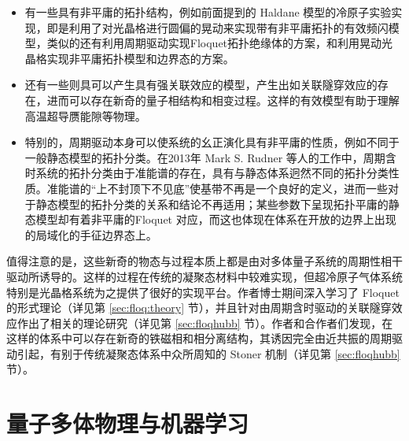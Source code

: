 \begin{itemize}

\item 有一些具有非平庸的拓扑结构，例如前面提到的 Haldane 模型的冷原子实验实现\cite{haldane-expr-2014}，即是利用了对光晶格进行圆偏的晃动来实现带有非平庸拓扑的有效频闪模型\cite{oka2009}，类似的还有利用周期驱动实现Floquet拓扑绝缘体的方案\cite{floq-ti-2011}，和利用晃动光晶格实现非平庸拓扑模型和边界态的方案\cite{zhengwei-floquet-2014}。

\item 还有一些则具可以产生具有强关联效应的模型，产生出如关联隧穿效应的存在\cite{correlated-tunnel-expr-2018-shaking,correlated-tunnel-expr-2018-raman}，进而可以存在新奇的量子相结构和相变过程\cite{floqhubb}。这样的有效模型有助于理解高温超导赝能隙等物理。

\item 特别的，周期驱动本身可以使系统的幺正演化具有非平庸的性质，例如不同于一般静态模型的拓扑分类\cite{floq-edgestate-2013-prx}。在2013年 Mark S. Rudner 等人的工作中，周期含时系统的拓扑分类由于准能谱的存在，具有与静态体系迥然不同的拓扑分类性质。准能谱的“上不封顶下不见底”使基带不再是一个良好的定义，进而一些对于静态模型的拓扑分类\cite{topoclassify2016}的关系和结论不再适用；某些参数下呈现拓扑平庸的静态模型却有着非平庸的Floquet 对应，而这也体现在体系在开放的边界上出现的局域化的手征边界态上。

\end{itemize}

值得注意的是，这些新奇的物态与过程本质上都是由对多体量子系统的周期性相干驱动所诱导的。这样的过程在传统的凝聚态材料中较难实现，但超冷原子气体系统特别是光晶格系统为之提供了很好的实现平台。作者博士期间深入学习了 Floquet 的形式理论（详见第 \ref{sec:floq:theory} 节），并且针对由周期含时驱动的关联隧穿效应作出了相关的理论研究\cite{floqhubb}（详见第 \ref{sec:floqhubb} 节）。作者和合作者们发现，在这样的体系中可以存在新奇的铁磁相和相分离结构，其诱因完全由近共振的周期驱动引起，有别于传统凝聚态体系中众所周知的 Stoner 机制（详见第 \ref{sec:floqhubb} 节）。





\section{量子多体物理与机器学习}

